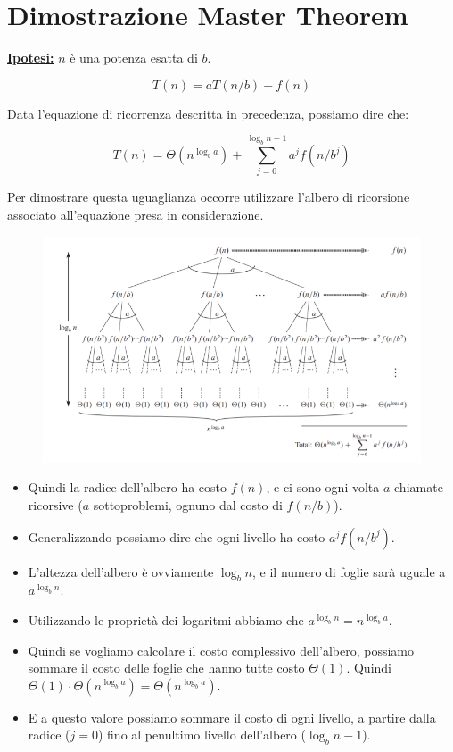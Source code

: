 \documentclass{article}
\begin{document}
\section{Dimostrazione Master Theorem}

\textbf{\underline{Ipotesi:}} $n$ è una potenza esatta di $b$.

\begin{equation}
    T(n) = aT(n/b) + f(n)
\end{equation}

Data l'equazione di ricorrenza descritta in precedenza, possiamo dire che:

\begin{equation}
    \displaystyle T(n) = \Theta(n^{\log_{b}a}) + \sum_{j = 0}^{\log_{b}n - 1} a^j f(n/b^j)
\end{equation}

Per dimostrare questa uguaglianza occorre utilizzare l'albero di ricorsione associato all'equazione presa in considerazione.

\begin{figure}[h]
    \includegraphics[scale=0.8]{img/albero_master_theorem.png}
    \centering
\end{figure}

\begin{itemize}
    \item Quindi la radice dell'albero ha costo $f(n)$, e ci sono ogni volta $a$ chiamate ricorsive ($a$ sottoproblemi, ognuno dal costo di $f(n/b)$).
    \item Generalizzando possiamo dire che ogni livello ha costo $a^j f(n/b^j)$.
    \item L'altezza dell'albero è ovviamente $\log_{b} n$, e il numero di foglie sarà uguale a $a^{\log_{b} n}$.
    \item Utilizzando le proprietà dei logaritmi abbiamo che $a^{\log_{b} n} = n^{\log_{b} a}$.
    \item Quindi se vogliamo calcolare il costo complessivo dell'albero, possiamo sommare il costo delle foglie che hanno tutte costo $\Theta(1)$. Quindi $\Theta(1) \cdot \Theta(n^{\log_{b} a}) = \Theta(n^{\log_{b} a})$.
    \item E a questo valore possiamo sommare il costo di ogni livello, a partire dalla radice ($j = 0$) fino al penultimo livello dell'albero ($\log_{b} n - 1$).
\end{itemize}
\end{document}
